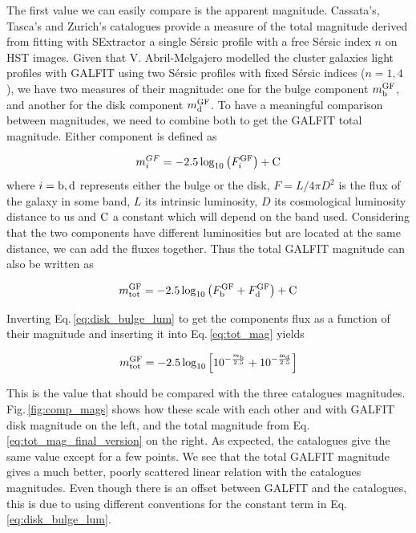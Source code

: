 The first value we can easily compare is the apparent magnitude. Cassata's, Tasca's and Zurich's catalogues provide a measure of the total magnitude derived from fitting with SExtractor a single Sérsic profile with a free Sérsic index $n$ on HST images. Given that V. Abril-Melgajero  modelled the cluster galaxies light profiles with GALFIT using two Sérsic profiles with fixed Sérsic indices ($n = 1, 4$), we have two measures of their magnitude: one for the bulge component $m_{\rm{b}}^{\rm{GF}}$, and another for the disk component $m_{\rm{d}}^{\rm{GF}}$. To have a meaningful comparison between magnitudes, we need to combine both to get the GALFIT total magnitude. Either component is defined as

\begin{equation}
	m_i^{GF} = -2.5 \log_{10} \left ( F_i^{\rm{GF}} \right ) + \rm{C}
	\label{eq:disk_bulge_lum}
\end{equation}
 where $i = \rm{b, d}$ represents either the bulge or the disk, $F = L/{4 \pi D^2}$ is the flux of the galaxy in some band, $L$ its intrinsic luminosity, $D$ its cosmological luminosity distance to us and $\rm{C}$ a constant which will depend on the band used. Considering that the two components have different luminosities but are located at the same distance, we can add the fluxes together. Thus the total GALFIT magnitude can also be written as

\begin{equation}
	m_{\rm{tot}}^{\rm{GF}} = - 2.5 \log_{10} \left ( F_{\rm{b}}^{\rm{GF}}  + F_{\rm{d}}^{\rm{GF}} \right ) + \rm{C}
	\label{eq:tot_mag}
\end{equation}

Inverting Eq.\,\ref{eq:disk_bulge_lum} to get the components flux as a function of their magnitude and inserting it into Eq.\,\ref{eq:tot_mag} yields

\begin{equation}
	m_{\rm{tot}}^{\rm{GF}} = -2.5 \log_{10} \left [ 10^{-\frac{m_{\rm{b}}}{2.5}} + 10^{-\frac{\rm{m_d}}{2.5}} \right ]
	\label{eq:tot_mag_final_version}
\end{equation}

This is the value that should be compared with the three catalogues magnitudes. Fig.\,\ref{fig:comp_mags} shows how these scale with each other and with GALFIT disk magnitude on the left, and the total magnitude from Eq.\,\ref{eq:tot_mag_final_version} on the right. As expected, the catalogues give the same value except for a few points. We see that the total GALFIT magnitude gives a much better, poorly scattered linear relation with the catalogues magnitudes. Even though there is an offset between GALFIT and the catalogues, this is due to using different conventions for the constant term in Eq.\,\ref{eq:disk_bulge_lum}.

